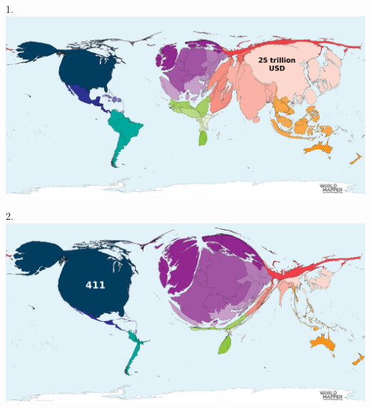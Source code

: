 \begin{frame}
\begin{center}
\Large
1. 
\\
\vspace{0.5em}\includegraphics[height=0.6\paperheight]{maps/picture_1.png}
\\
\end{center}
\end{frame}
\begin{frame}
\begin{center}
\Large
2. 
\\
\vspace{0.5em}\includegraphics[height=0.6\paperheight]{maps/picture_2.png}
\\
\end{center}
\end{frame}
